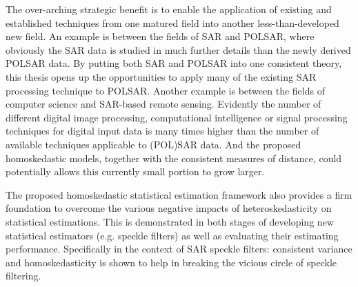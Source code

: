 The over-arching strategic benefit is to enable the application of existing and established techniques from one matured field into another less-than-developed new field.
An example is between the fields of SAR and POLSAR, where obviously the SAR data is studied in much further details than the newly derived POLSAR data.
By putting both SAR and POLSAR into one consistent theory, this thesis opens up the opportunities to apply many of the existing SAR processing technique to POLSAR.
Another example is between the fields of computer science and SAR-based remote sensing.
Evidently the number of different digital image processing, computational intelligence or signal processing techniques for digital input data is many times higher than the number of available techniques applicable to (POL)SAR data.
And the proposed homoskedastic models, together with the consistent measures of distance,  %
could potentially allows this currently small portion to grow larger.

The proposed homoskedastic statistical estimation framework also provides a firm foundation
to overcome the various negative impacts of heteroskedasticity on statistical estimations.
This
                is demonstrated in both stages of developing new
                statistical estimators (e.g. speckle filters) as well as evaluating their estimating performance.
Specifically
                in the context of SAR speckle filters: consistent
                variance and homoskedasticity is shown to help in
                breaking the vicious circle of speckle filtering.

